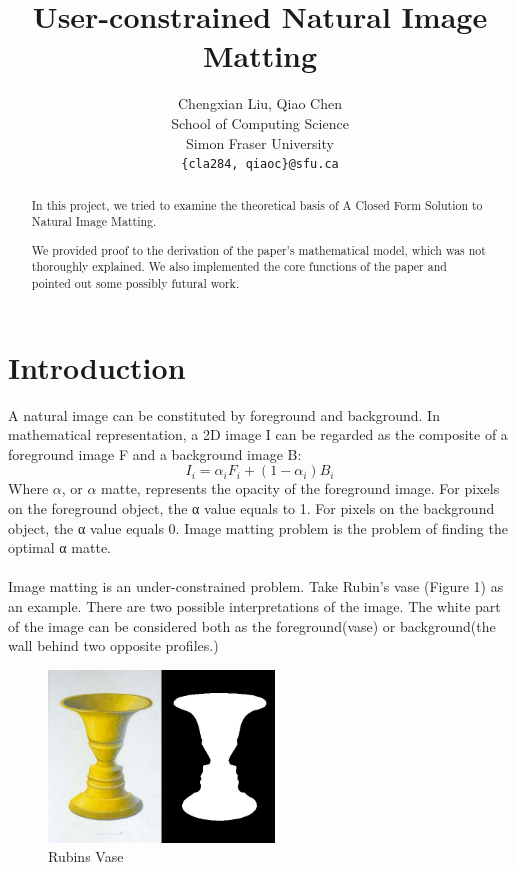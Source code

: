 \documentclass[11pt,letterpaper]{article}
\title{User-constrained Natural Image Matting}
\author{Chengxian Liu, Qiao Chen\\
  School of Computing Science \\ Simon Fraser University \\
  {\tt \{cla284, qiaoc\}@sfu.ca}  
}
\begin{document}
\maketitle
\begin{abstract}
In this project, we tried to examine the theoretical basis of A Closed Form Solution to Natural Image Matting. ~\cite{Levin:2006}

We provided proof to the derivation of the paper’s mathematical model, which was not thoroughly explained. We also implemented the core functions of the paper and pointed out some possibly futural work.
\end{abstract}

\section{Introduction}
A natural image can be constituted by foreground and background. In mathematical representation, a 2D image I can be regarded as the composite of a foreground image F and a background image B:
$$I_{i} = \alpha_{i}F_{i} + (1-\alpha_{i})B_{i}$$
Where $\alpha$, or $\alpha$ matte, represents the opacity of the foreground image. For pixels on the foreground object, the α value equals to 1. For pixels on the background object, the α value equals 0. Image matting problem is the problem of finding the optimal α matte.\\\\
Image matting is an under-constrained problem. Take Rubin’s vase (Figure 1) as an example. There are two possible interpretations of the image. The white part of the image can be considered both as the foreground(vase) or background(the wall behind two opposite profiles.)

\begin{figure}[h]
  \begin{center}
    \includegraphics[width=6cm]{rubins_vase.jpg} 
    \caption{Rubins Vase}
  \end{center}
\end{figure}
\end{document}
